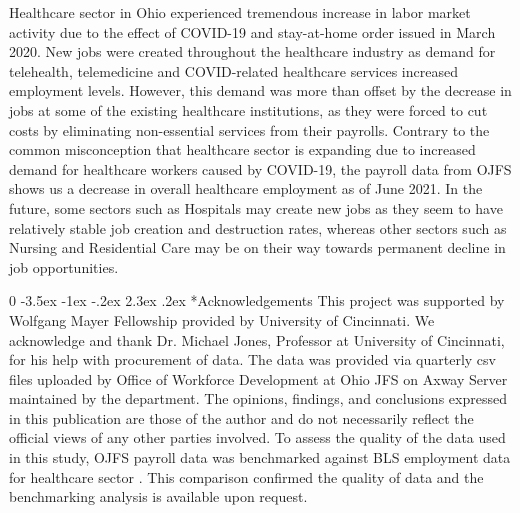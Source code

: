 \documentclass[11pt]{article}
\makeatletter
\newcommand{\blind}{0}
\renewcommand\section{\@startsection {section}{1}{\z@}%
                                       {-3.5ex \@plus -1ex \@minus -.2ex}%
                                       {2.3ex \@plus.2ex}%
                                       {\normalfont\fontfamily{phv}\fontsize{16}{19}\bfseries}}
\makeatother
\begin{document}
Healthcare sector in Ohio experienced tremendous increase in labor market activity due to the effect of COVID-19 and stay-at-home order issued in March 2020. New jobs were created throughout the healthcare industry as demand for telehealth, telemedicine and COVID-related healthcare services increased employment levels. However, this demand was more than offset by the decrease in jobs at some of the existing healthcare institutions, as they were forced to cut costs by eliminating non-essential services from their payrolls. Contrary to the common misconception that healthcare sector is expanding due to increased demand for healthcare workers caused by COVID-19, the payroll data from OJFS shows us a decrease in overall healthcare employment as of June 2021. In the future, some sectors such as Hospitals may create new jobs as they seem to have relatively stable job creation and destruction rates, whereas other sectors such as Nursing and Residential Care may be on their way towards permanent decline in job opportunities. 



\blind{
\section*{Acknowledgements}
This project was supported by Wolfgang Mayer Fellowship provided by University of Cincinnati. We acknowledge and thank Dr. Michael Jones, Professor at University of Cincinnati, for his help with procurement of data. The data was provided via quarterly csv files uploaded by Office of Workforce Development at Ohio JFS on Axway Server maintained by the department. The opinions, findings, and conclusions expressed in this publication are those of the author and do not necessarily reflect the official views of any other parties involved. To assess the quality of the data used in this study, OJFS payroll data was benchmarked against BLS employment data for healthcare sector . This comparison confirmed the quality of data and the benchmarking analysis is available upon request.	} \fi



	
\end{document}
